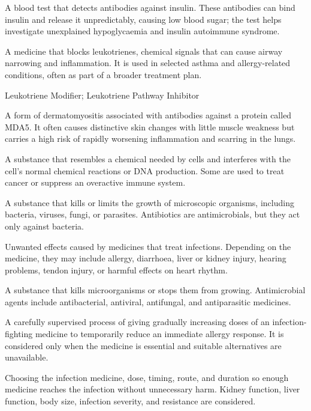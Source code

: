  A blood test that detects antibodies against insulin. These antibodies can bind insulin and release it unpredictably, causing low blood sugar; the test helps investigate unexplained hypoglycaemia and insulin autoimmune syndrome.

 A medicine that blocks leukotrienes, chemical signals that can cause airway narrowing and inflammation. It is used in selected asthma and allergy-related conditions, often as part of a broader treatment plan.

\synonyms
Leukotriene Modifier; Leukotriene Pathway Inhibitor

 A form of dermatomyositis associated with antibodies against a protein called MDA5. It often causes distinctive skin changes with little muscle weakness but carries a high risk of rapidly worsening inflammation and scarring in the lungs.

 A substance that resembles a chemical needed by cells and interferes with the cell’s normal chemical reactions or DNA production. Some are used to treat cancer or suppress an overactive immune system.

 A substance that kills or limits the growth of microscopic organisms, including bacteria, viruses, fungi, or parasites. Antibiotics are antimicrobials, but they act only against bacteria.

 Unwanted effects caused by medicines that treat infections. Depending on the medicine, they may include allergy, diarrhoea, liver or kidney injury, hearing problems, tendon injury, or harmful effects on heart rhythm.

 A substance that kills microorganisms or stops them from growing. Antimicrobial agents include antibacterial, antiviral, antifungal, and antiparasitic medicines.

 A carefully supervised process of giving gradually increasing doses of an infection-fighting medicine to temporarily reduce an immediate allergy response. It is considered only when the medicine is essential and suitable alternatives are unavailable.

 Choosing the infection medicine, dose, timing, route, and duration so enough medicine reaches the infection without unnecessary harm. Kidney function, liver function, body size, infection severity, and resistance are considered.

